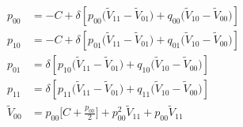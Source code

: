 \begin{align}
    p_{00} &= -C + \delta \left[p_{00}\Bigr(\tilde{V}_{11}-\tilde{V}_{01}\Bigr) + q_{00}\Bigr(\tilde{V}_{10}-\tilde{V}_{00}\Bigr)\right] \\
    p_{10} &= -C + \delta \left[p_{01}\Bigr(\tilde{V}_{11}-\tilde{V}_{01}\Bigr) + q_{01}\Bigr(\tilde{V}_{10}-\tilde{V}_{00}\Bigr)\right] \\
    p_{01} &= \delta \left[p_{10}\Bigr(\tilde{V}_{11}-\tilde{V}_{01}\Bigr) + q_{10}\Bigr(\tilde{V}_{10}-\tilde{V}_{00}\Bigr)\right] \\
    p_{11} &= \delta \left[p_{11}\Bigr(\tilde{V}_{11}-\tilde{V}_{01}\Bigr) + q_{11}\Bigr(\tilde{V}_{10}-\tilde{V}_{00}\Bigr)\right] \\
    \tilde{V}_{00} &= p_{00}\Bigr[C + \frac{p_{00}}{2} \Bigr] + p_{00}^2\tilde{V}_{11} + p_{00}\tilde{V}_{11}
\end{align}

